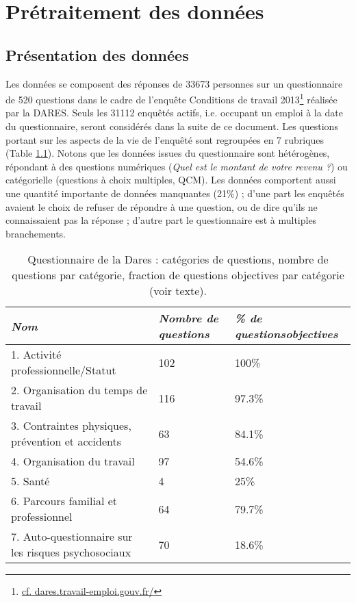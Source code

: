 \documentclass[11pt,fleqn,openany,frenchb]{book} %
\def\NOTE#1{\footnote{MS : #1}}
\begin{document}
\chapter{Prétraitement des données}
\section{Présentation des données}

Les données se composent des réponses de 33673 personnes sur un questionnaire de 520 questions dans le cadre de l'enquête Conditions de travail 2013\footnote{\href{http://dares.travail-emploi.gouv.fr/dares-etudes-et-statistiques/enquetes-de-a-a-z/article/conditions-de-travail-edition-2013}{cf. dares.travail-emploi.gouv.fr/}} réalisée par la DARES. Seuls les 31112 enquêtés actifs, i.e. occupant un emploi à la date du questionnaire, seront considérés dans la suite de ce document. Les questions portant sur les aspects de la vie de l'enquêté sont regroupées en 7 rubriques (Table \ref{tab:cat_questions}). Notons que les données issues du questionnaire sont hétérogènes, répondant à des questions numériques (\textit{Quel est le montant de votre revenu ?}) ou catégorielle (questions à choix multiples, QCM). Les données comportent aussi une quantité importante de données manquantes (21\%) ; d'une part
les enquêtés avaient le choix de refuser de répondre à une question, ou de dire qu'ils ne connaissaient pas la réponse ; d'autre part le questionnaire est à multiples branchements. \par

\begin{table}[!h]
\centering
\begin{tabular}{|l||p{2cm}|p{2.3cm}|}
\hline
    {\em Nom} & {\em Nombre de \newline questions} & {\em \% de questions\newline objectives}\\
    \hline
1. Activité professionnelle/Statut & 102 & 100\% \\
2. Organisation du temps de travail & 116 & 97.3\%\\
3. Contraintes physiques, prévention et accidents & 63 & 84.1\%\\
4. Organisation du travail & 97 & 54.6\%\\
5. Santé & 4 & 25\%\\
6. Parcours familial et professionnel & 64 & 79.7\%\\
7. Auto-questionnaire sur les risques psychosociaux & 70 & 18.6\%\\
\hline
\end{tabular}%
\caption{Questionnaire de la Dares : catégories de questions, nombre de questions par catégorie, fraction de questions objectives par catégorie (voir texte).}
\label{tab:cat_questions}
\end{table}
\end{document}
